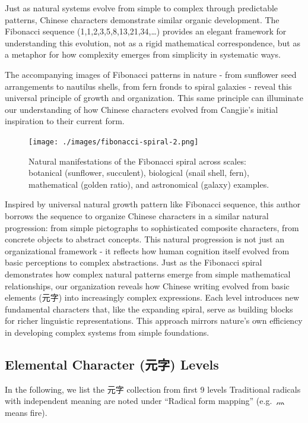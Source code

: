 \documentclass[11pt,letterpaper]{article}
\begin{document}
Just as natural systems evolve from simple to complex through
predictable patterns, Chinese characters demonstrate similar organic
development. The Fibonacci sequence (1,1,2,3,5,8,13,21,34,\ldots)
provides an elegant framework for understanding this evolution, not as a
rigid mathematical correspondence, but as a metaphor for how complexity
emerges from simplicity in systematic ways.

The accompanying images of Fibonacci patterns in nature - from sunflower
seed arrangements to nautilus shells, from fern fronds to spiral
galaxies - reveal this universal principle of growth and organization.
This same principle can illuminate our understanding of how Chinese
characters evolved from Cangjie's initial inspiration to their current
form.

\begin{figure}
\centering
\texttt{[image: ./images/fibonacci-spiral-2.png]}
\caption{Natural manifestations of the Fibonacci spiral across scales: botanical (sunflower, succulent), biological (snail shell, fern), mathematical (golden ratio), and astronomical (galaxy) examples.}
\end{figure}

Inspired by universal natural growth pattern like Fibonacci sequence,
this author borrows the sequence to organize Chinese characters in a
similar natural progression: from simple pictographs to sophisticated
composite characters, from concrete objects to abstract concepts. This
natural progression is not just an organizational framework - it
reflects how human cognition itself evolved from basic perceptions to
complex abstractions. Just as the Fibonacci spiral demonstrates how
complex natural patterns emerge from simple mathematical relationships,
our organization reveals how Chinese writing evolved from basic elements
(元字) into increasingly complex expressions. Each level introduces new
fundamental characters that, like the expanding spiral, serve as
building blocks for richer linguistic representations. This approach
mirrors nature's own efficiency in developing complex systems from
simple foundations.

\subsection{Elemental Character (元字) Levels}\label{elemental-character-ux5143ux5b57-levels}

In the following, we list the 元字 collection from first 9 levels
Traditional radicals with independent meaning are noted under ``Radical
form mapping'' (e.g.~灬 means fire).
\end{document}
